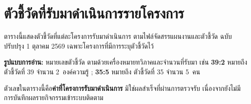 \chapter{ตัวชี้วัดที่รับมาดำเนินการรายโครงการ}

ตารางนี้แสดงตัวชี้วัดที่แต่ละโครงการรับมาดำเนินการ ตามไฟล์จัดสรรแผนงานและตัวชี้วัด
ฉบับปรับปรุง 1 ตุลาคม 2569 เฉพาะโครงการที่มีการระบุตัวชี้วัดไว้

\textbf{รูปแบบการอ่าน:} หมายเลขตัวชี้วัด ตามด้วยเครื่องหมายทวิภาคและจำนวนที่รับมา
เช่น \textbf{39:2} หมายถึง ตัวชี้วัดที่ 39 จำนวน 2~องค์ความรู้ ;
\textbf{35:5} หมายถึง ตัวชี้วัดที่ 35 จำนวน 5~คน



\begin{infobox}
ตัวเลขในตารางนี้คือ\textbf{ค่าที่โครงการรับมาดำเนินการ} มิใช่ผลสำเร็จที่ผ่านการตรวจรับ
เนื่องจากยังไม่มีการบันทึกผลรายกิจกรรมเข้าระบบติดตาม
\end{infobox}
